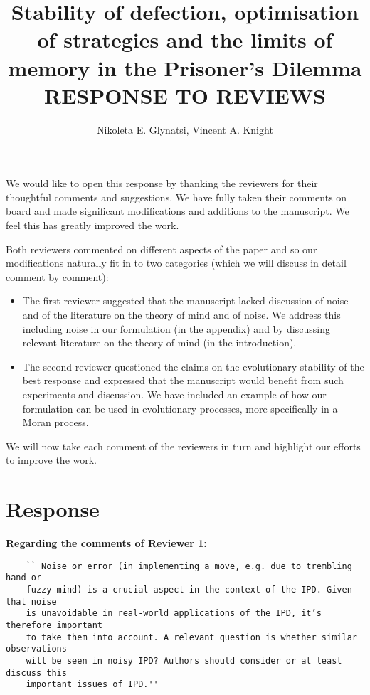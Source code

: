 \documentclass{article}
\title{Stability of defection, optimisation of strategies and the limits of
memory in the Prisoner's Dilemma RESPONSE TO REVIEWS}
\author{Nikoleta E. Glynatsi, Vincent A. Knight}
\begin{document}
\maketitle

We would like to open this response by thanking the reviewers for their
thoughtful comments and suggestions. We have fully taken their comments on board
and made significant modifications and additions to the manuscript.
We feel this has greatly improved the work.

Both reviewers commented on different aspects of the paper and so our
modifications naturally fit in to two categories (which we will discuss in
detail comment by comment):

\begin{itemize}
    \item The first reviewer suggested that the manuscript lacked discussion of
    noise and of the literature on the theory of mind and of noise. We address
    this including noise in our formulation (in the appendix) and by discussing
    relevant literature on the theory of mind (in the introduction).
    \item The second reviewer questioned the claims on the evolutionary
    stability of the best response and expressed that the manuscript would
    benefit from such experiments and discussion. We have included an example of
    how our formulation can be used in evolutionary processes, more
    specifically in a Moran process.
\end{itemize}

We will now take each comment of the reviewers in turn and highlight our efforts
to improve the work.

\section{Response}

\textbf{Regarding the comments of Reviewer 1:}

\begin{verbatim}
    `` Noise or error (in implementing a move, e.g. due to trembling hand or
    fuzzy mind) is a crucial aspect in the context of the IPD. Given that noise
    is unavoidable in real-world applications of the IPD, it’s therefore important
    to take them into account. A relevant question is whether similar observations
    will be seen in noisy IPD? Authors should consider or at least discuss this
    important issues of IPD.''
\end{verbatim}
\end{document}
